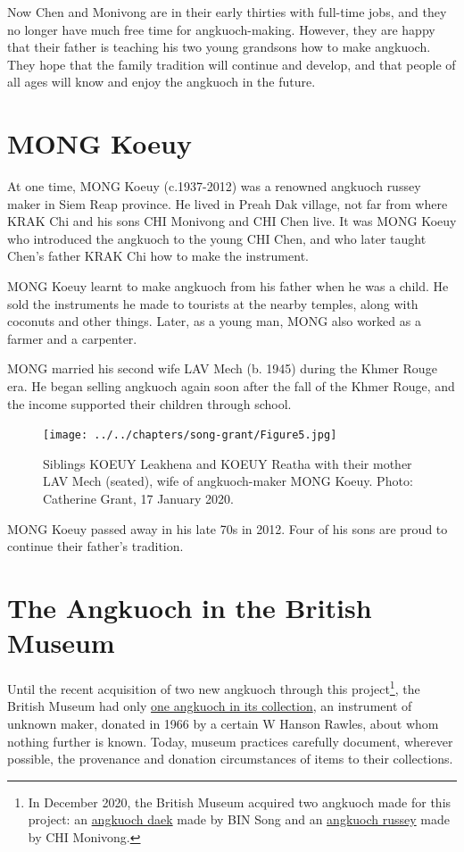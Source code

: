 \documentclass[twoside]{article}
\begin{document}
Now Chen and Monivong are in their early thirties with full-time jobs,
and they no longer have much free time for angkuoch-making. However,
they are happy that their father is teaching his two young grandsons how
to make angkuoch. They hope that the family tradition will continue and
develop, and that people of all ages will know and enjoy the angkuoch in
the future.

\hypertarget{mong-koeuy}{%
\section*{MONG Koeuy}\label{mong-koeuy}}

At one time, MONG Koeuy (c.1937-2012) was a renowned angkuoch russey
maker in Siem Reap province. He lived in Preah Dak village, not far from
where KRAK Chi and his sons CHI Monivong and CHI Chen live. It was MONG
Koeuy who introduced the angkuoch to the young CHI Chen, and who later
taught Chen's father KRAK Chi how to make the instrument.

MONG Koeuy learnt to make angkuoch from his father when he was a child.
He sold the instruments he made to tourists at the nearby temples, along
with coconuts and other things. Later, as a young man, MONG also worked
as a farmer and a carpenter.

MONG married his second wife LAV Mech (b. 1945) during the Khmer Rouge
era. He began selling angkuoch again soon after the fall of the Khmer
Rouge, and the income supported their children through school.

\begin{figure}
  \texttt{[image: ../../chapters/song-grant/Figure5.jpg]}
  \caption{Siblings KOEUY Leakhena
  and KOEUY Reatha with their mother LAV Mech (seated), wife of
  angkuoch-maker MONG Koeuy. Photo: Catherine Grant, 17 January 2020.}
\end{figure}

MONG Koeuy passed away in his late 70s in 2012. Four of his sons are
proud to continue their father's tradition.

\hypertarget{the-angkuoch-in-the-british-museum}{%
\section*{The Angkuoch in the British
Museum}\label{the-angkuoch-in-the-british-museum}}

Until the recent acquisition of two new angkuoch through this
project\footnote{In December 2020, the British Museum acquired two
  angkuoch made for this project: an
  \href{https://www.britishmuseum.org/collection/object/A_2020-3017-2}{angkuoch
  daek} made by BIN Song and an
  \href{https://www.britishmuseum.org/collection/object/A_2020-3017-1}{angkuoch
  russey} made by CHI Monivong.}, the British Museum had only
\href{https://www.britishmuseum.org/collection/object/A_As1966-11-5}{one
angkuoch in its collection}, an instrument of unknown maker, donated in
1966 by a certain W Hanson Rawles, about whom nothing further is known.
Today, museum practices carefully document, wherever possible, the
provenance and donation circumstances of items to their collections.
\end{document}
